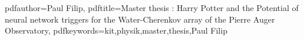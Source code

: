 \newcommand{\thesisentopic}{Harry Potter and the Potential of neural network triggers for the Water-Cherenkov array of the Pierre Auger Observatory}

\newcommand{\thesisinstitute}{Institute for Astroparticle Physics}

\newcommand{\thesisauthor}{Paul Filip}
\newcommand{\thesisreviewerone}{Prof. Dr. Ralph Engel}
\newcommand{\thesisreviewertwo}{Prof. Dr. Guido Drexlin}

\newcommand{\thesistimestart}{01.04.2022}
\newcommand{\thesistimeend}{02.05.2022}
\newcommand{\thesistimehandin}{TBD}

\hypersetup
{
	pdfauthor={\thesisauthor},
	pdftitle={Master thesis : \thesisentopic},
	pdfkeywords={kit,physik,master,thesis,\thesisauthor}
}
